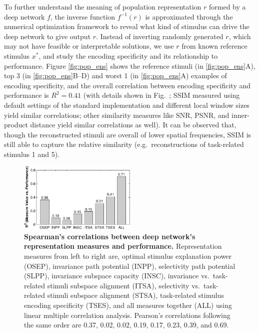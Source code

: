 To further understand the meaning of population representation $r$ formed by a deep network $f$, the inverse function $f^{-1}\left( r \right)$ is approximated through the numerical optimization framework to reveal what kind of stimulus can drive the deep network to give output $r$. Instead of inverting randomly generated $r$, which may not have feasible or interpretable solutions, we use $r$ from known reference stimulus $x^{*}$, and study the encoding specificity and its relationship to performance. Figure \ref{fig:pop_ens} shows the reference stimuli (in \ref{fig:pop_ens}A), top 3 (in \ref{fig:pop_ens}B--D) and worst 1 (in \ref{fig:pop_ens}A) examples of encoding specificity, and the overall correlation between encoding specificity and performance is $R^2=0.41$ (with details shown in Fig.~\SFenc{}; SSIM measured using default settings of the standard implementation \cite{wang2004image} and different local window sizes yield similar correlations; other similarity measures like SNR, PSNR, and inner-product distance yield similar correlations as well). It can be observed that, though the reconstructed stimuli are overall of lower spatial frequencies, SSIM is still able to capture the relative similarity (e.g.~reconstructions of task-related stimulus 1 and 5).

\begin{figure}
\centering \includegraphics[width=0.5\textwidth]{Figs/e_fig7-crop.pdf}
\caption{
{\bf Spearman's correlations between deep network's representation measures and performance.} Representation measures from left to right are, optimal stimulus explanation power (OSEP), invariance path potential (INPP), selectivity path potential (SLPP), invariance subspace capacity (INSC), invariance vs.~task-related stimuli subspace alignment (ITSA), selectivity vs.~task-related stimuli subspace alignment (STSA), task-related stimulus encoding specificity (TSES), and all measures together (ALL) using linear multiple correlation analysis. Pearson's correlations following the same order are 0.37, 0.02, 0.02, 0.19, 0.17, 0.23, 0.39, and 0.69.}
\label{fig:all_R^2}
\end{figure}

